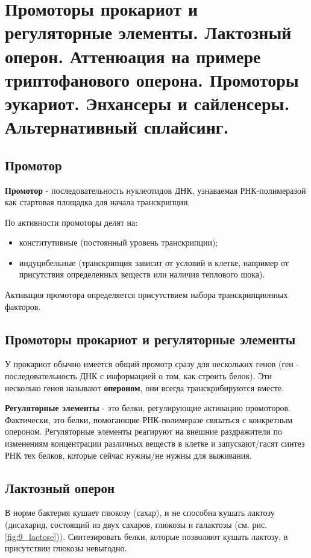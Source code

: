 \section{Промоторы прокариот и регуляторные элементы. Лактозный оперон. Аттенюация на примере 
триптофанового оперона. 
Промоторы эукариот. Энхансеры и сайленсеры. 
Альтернативный сплайсинг.}

\subsection{Промотор}

\textbf{Промотор} - последовательность нуклеотидов ДНК, узнаваемая РНК-полимеразой как стартовая площадка для начала транскрипции. 

По активности промоторы делят на:
\begin{itemize}
    \item конститутивные (постоянный уровень транскрипции);
    \item индуцибельные (транскрипция зависит от условий в клетке, например от присутствия определенных веществ или наличия теплового шока).
\end{itemize}

Активация промотора определяется присутствием набора транскрипционных факторов.

\subsection{Промоторы прокариот и регуляторные элементы}
У прокариот обычно имеется общий промотр сразу для нескольких генов (ген - последовательность ДНК с информацией о том, как строить белок). Эти несколько генов называют \textbf{опероном}, они всегда транскрибируются вместе. 

\textbf{Регуляторные элементы} - это белки, регулирующие активацию промоторов. Фактически, это белки, помогающие РНК-полимеразе связаться с конкретным опероном. Регуляторные элементы реагируют на внешние раздражители по изменениям концентрации различных веществ в клетке и запускают/гасят синтез РНК тех белков, которые сейчас нужны/не нужны для выживания.

\subsection{Лактозный оперон}
В норме бактерия кушает глюкозу (сахар), и не способна кушать лактозу (дисахарид, состоящий из двух сахаров, глюкозы и галактозы (см. рис. \ref{fig:9_lactose})). Синтезировать белки, которые позволяют кушать лактозу, в присутствии глюкозы невыгодно.


